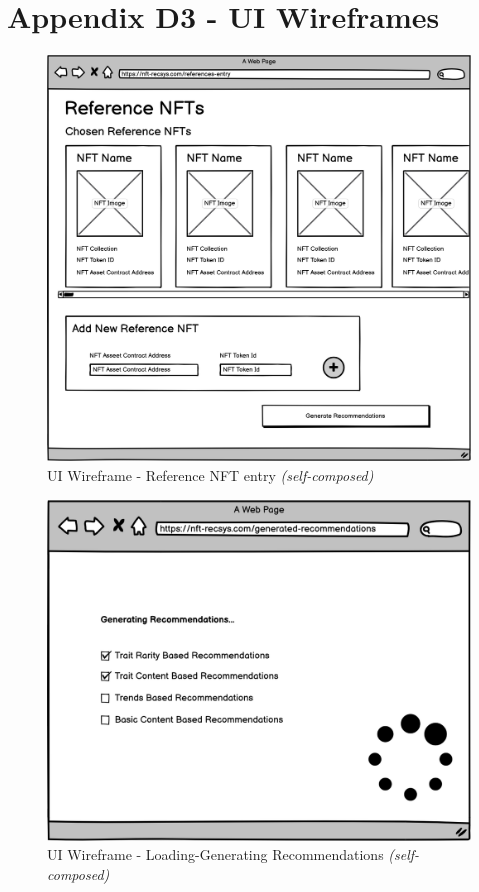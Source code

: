 \clearpage
\section*{Appendix D3 - UI Wireframes}

\begin{figure}[h!]
\centering
\includegraphics[width=\textwidth]{images/appendix/UI Wireframes/Reference NFT entry.png}
\caption{UI Wireframe - Reference NFT entry \textit{(self-composed)}}
\end{figure}

\begin{figure}[h!]
\centering
\includegraphics[width=\textwidth]{images/appendix/UI Wireframes/Loading-Generating Recommendations.png}
\caption{UI Wireframe - Loading-Generating Recommendations \textit{(self-composed)}}
\end{figure}

